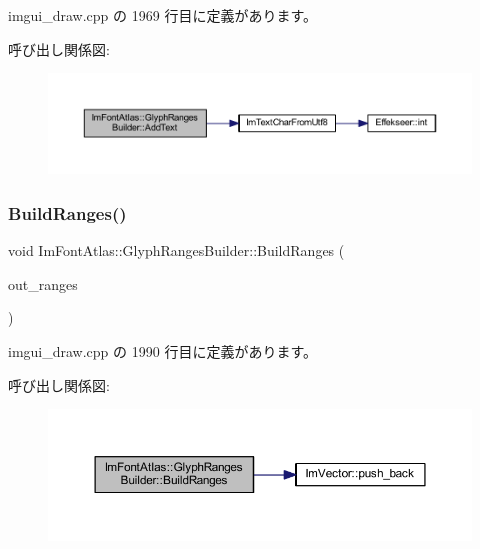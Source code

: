  imgui\+\_\+draw.\+cpp の 1969 行目に定義があります。

呼び出し関係図\+:\nopagebreak
\begin{figure}[H]
\begin{center}
\leavevmode
\includegraphics[width=350pt]{struct_im_font_atlas_1_1_glyph_ranges_builder_a6c0f9756dc8ea184920d5ff28bfdb669_cgraph}
\end{center}
\end{figure}
\mbox{\label{struct_im_font_atlas_1_1_glyph_ranges_builder_aa55b5710971adef2e4c690a3e46de6d5}} 
\subsubsection{\texorpdfstring{Build\+Ranges()}{BuildRanges()}}
{\footnotesize\ttfamily void Im\+Font\+Atlas\+::\+Glyph\+Ranges\+Builder\+::\+Build\+Ranges (\begin{DoxyParamCaption}\item[{\mbox{\hyperlink{class_im_vector}{Im\+Vector}}$<$ \mbox{\hyperlink{imgui_8h_af2c7badaf05a0008e15ef76d40875e97}{Im\+Wchar}} $>$ $\ast$}]{out\+\_\+ranges }\end{DoxyParamCaption})}



 imgui\+\_\+draw.\+cpp の 1990 行目に定義があります。

呼び出し関係図\+:\nopagebreak
\begin{figure}[H]
\begin{center}
\leavevmode
\includegraphics[width=350pt]{struct_im_font_atlas_1_1_glyph_ranges_builder_aa55b5710971adef2e4c690a3e46de6d5_cgraph}
\end{center}
\end{figure}
\mbox{\label{struct_im_font_atlas_1_1_glyph_ranges_builder_a157a4d95c361d717c073d5815d576eb5}} 
